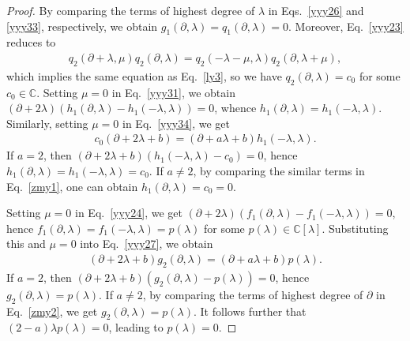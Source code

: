 \documentclass[11pt,letterpaper,reqno]{amsart}
\theoremstyle{definition}
\numberwithin{equation}{section}
\begin{document}
\begin{proof}
By comparing the terms of highest degree of $\lambda$ in Eqs.~\eqref{yyy26} and \eqref{yyy33}, respectively, we obtain $g_1(\partial, \lambda)=q_1(\partial, \lambda)=0$.
Moreover, Eq.~\eqref{yyy23} reduces to
\begin{align}
q_2(\partial+\lambda, \mu)q_2(\partial, \lambda)=q_2(-\lambda-\mu, \lambda)q_2(\partial, \lambda+\mu),
\end{align}
which implies the same equation as Eq.~\eqref{ly3}, so we have $q_2(\partial, \lambda)=c_0$ for some $c_0\in\mathbb{C}$.
Setting $\mu=0$ in Eq.~\eqref{yyy31}, we obtain $(\partial+2\lambda)(h_1(\partial, \lambda)-h_1(-\lambda, \lambda))=0$,
whence $h_1(\partial, \lambda)=h_1(-\lambda, \lambda)$. Similarly, setting $\mu=0$ in Eq.~\eqref{yyy34}, we get
\begin{align}\label{zmy1}
c_{0}(\partial+2\lambda+b)=(\partial+a\lambda+b)h_1(-\lambda, \lambda).
\end{align}
If $a=2$, then $(\partial+2\lambda+b)(h_1(-\lambda, \lambda)-c_0)=0$, hence $h_1(\partial, \lambda)=h_1(-\lambda, \lambda)=c_0$.
If $a\neq2$, by comparing the similar terms in Eq.~\eqref{zmy1}, one can obtain $h_1(\partial, \lambda)=c_0=0$.

Setting $\mu=0$ in Eq.~\eqref{yyy24}, we get $(\partial+2\lambda)(f_1(\partial, \lambda)-f_1(-\lambda, \lambda))=0$,
hence $f_1(\partial, \lambda)=f_1(-\lambda, \lambda)=p(\lambda)$ for some $p(\lambda)\in\mathbb{C}[\lambda]$.
Substituting this and $\mu=0$ into Eq.~\eqref{yyy27}, we obtain
\begin{align}\label{zmy2}
(\partial+2\lambda+b)g_2(\partial, \lambda)=(\partial+a\lambda+b)p(\lambda).
\end{align}
If $a=2$, then $(\partial+2\lambda+b)(g_2(\partial, \lambda)-p(\lambda))=0$, hence $g_2(\partial, \lambda)=p(\lambda)$.
If $a\neq2$, by comparing the terms of highest degree of $\partial$ in Eq.~\eqref{zmy2}, we get $g_2(\partial, \lambda)=p(\lambda)$.
It follows further that $(2-a)\lambda p(\lambda)=0$, leading to $p(\lambda)=0$.


\end{proof}
\end{document}
